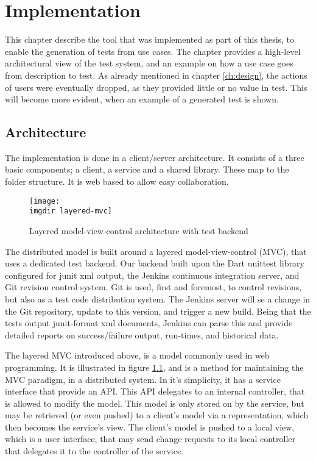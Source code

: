 \chapter{Implementation}
This chapter describe the tool that was implemented as part of this thesis, to enable the generation of tests from use cases. The chapter provides a high-level architectural view of the test system, and an example on how a use case goes from description to test.\medskip
As already mentioned in chapter \ref{ch:design}, the actions of users were eventually dropped, as they provided little or no value in test. This will become more evident, when an example of a generated test is shown.

\section{Architecture}
The implementation is done in a client/server architecture. It consists of a three basic components; a client, a service and a shared library. These map to the folder structure. It is web based to allow easy collaboration.\medskip
\begin{figure}[!htbp]
  \centering
  \texttt{[image: \\imgdir layered-mvc]}
  \caption{Layered model-view-control architecture with test backend}
  \label{fig:layered-mvc}
\end{figure}
\noindent The distributed model is built around a layered model-view-control (MVC), that uses a dedicated test backend. Our backend built upon the Dart unittest library configured for junit xml output, the Jenkins continuous integration server, and Git revision control system. Git is used, first and foremost, to control revisions, but also as a test code distribution system. The Jenkins server will se a change in the Git repository, update to this version, and trigger a new build. Being that the tests output junit-format xml documents, Jenkins can parse this and provide detailed reports on success/failure output, run-times, and historical data.\medskip

\noindent The layered MVC introduced above, is a model commonly used in web programming. It is illustrated in figure \ref{fig:layered-mvc}, and is a method for maintaining the MVC paradigm, in a distributed system. In it's simplicity, it has a service interface that provide an API. This API delegates to an internal controller, that is allowed to modify the model. This model is only stored on by the service, but may be retrieved (or even pushed) to a client's model via a representation, which then becomes the service's view. The client's model is pushed to a local view, which is a user interface, that may send change requests to its local controller that delegates it to the controller of the service.\medskip

